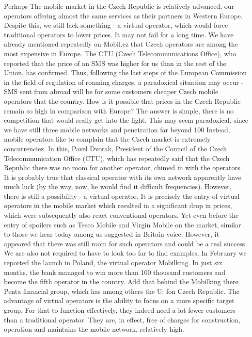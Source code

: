 Perhaps
The mobile market in the Czech Republic is relatively advanced, our operators offering almost the same services as their partners in Western Europe.
Despite this, we still lack something - a virtual operator, which would force traditional operators to lower prices.
It may not fail for a long time.
We have already mentioned repeatedly on Mobil.cz that Czech operators are among the most expensive in Europe.
The CTU (Czech Telecommunications Office), who reported that the price of an SMS was higher for us than in the rest of the Union, has confirmed.
Thus, following the last steps of the European Commission in the field of regulation of roaming charges, a paradoxical situation may occur - SMS sent from abroad will be for some customers cheaper Czech mobile operators that the country.
How is it possible that prices in the Czech Republic remain so high in comparison with Europe?
The answer is simple, there is no competition that would really get into the fight.
This may seem paradoxical, since we have still three mobile networks and penetration far beyond 100%
Instead, mobile operators like to complain that the Czech market is extremely concurrenciez.
In this, Pavel Dvorak, President of the Council of the Czech Telecommunication Office (CTU), which has repeatedly said that the Czech Republic there was no room for another operator, chimed in with the operators.
It is probably true that classical operator with its own network apparently have much luck (by the way, now, he would find it difficult frequencies).
However, there is still a possibility - a virtual operator.
It is precisely the entry of virtual operators in the mobile market which resulted in a significant drop in prices, which were subsequently also react conventional operators.
Yet even before the entry of spoilers such as Tesco Mobile and Virgin Mobile on the market, similar to those we hear today among us suggested in Britain voice.
However, it appeared that there was still room for such operators and could be a real success.
We are also not required to have to look too far to find examples.
In February we reported the launch in Poland, the virtual operator Mobilking.
In just six months, the bank managed to win more than 100 thousand customers and become the fifth operator in the country.
Add that behind the Mobilking there Penta financial group, which has among others the U: fon Czech Republic.
The advantage of virtual operators is the ability to focus on a more specific target group.
For that to function effectively, they indeed need a lot fewer customers than a traditional operator.
They are, in effect, free of charges for construction, operation and maintains the mobile network, relatively high.
